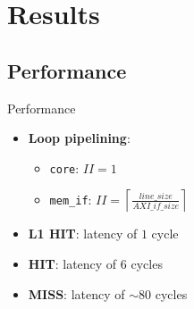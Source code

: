 \documentclass[handout,aspectratio=169]{beamer}
\begin{document}
\section{Results}
\subsection{Performance}
\begin{frame}{Performance}
	\begin{itemize}
		\item \textbf{Loop pipelining}:
			\begin{itemize}
				\item \texttt{core}: $II=1$
				\item \texttt{mem\_if}: $II=\left\lceil \frac{line\_size}{AXI\_if\_size} \right\rceil$
			\end{itemize}
		\item \textbf{L1 HIT}: latency of $1$ cycle
		\item \textbf{HIT}: latency of $6$ cycles
		\item \textbf{MISS}: latency of $\sim 80$ cycles
	\end{itemize}
\end{frame}
\end{document}
